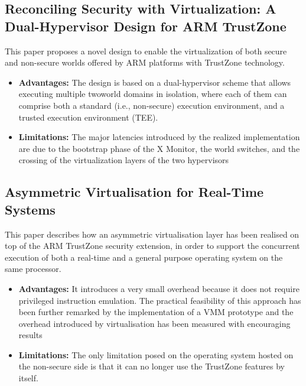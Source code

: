 \documentclass[conference]{IEEEtran}
\begin{document}
\subsection{Reconciling Security with Virtualization: A Dual-Hypervisor Design for ARM TrustZone}
This paper proposes a novel design to enable the virtualization of both secure and non-secure worlds offered by ARM platforms with TrustZone technology.
\begin{itemize}
    \item \textbf{Advantages:} The design is based on a dual-hypervisor scheme that allows executing multiple twoworld domains in isolation, where each of them can comprise both a standard (i.e., non-secure) execution environment, and a trusted execution environment (TEE).
    \item \textbf{Limitations:} The major latencies introduced by the realized implementation are due to the bootstrap phase of the X Monitor, the world switches, and the crossing of the virtualization layers of the two hypervisors
\end{itemize}


\subsection{Asymmetric Virtualisation for Real-Time Systems}
This paper describes how an asymmetric virtualisation layer has been realised on top of the ARM TrustZone security extension, in order to support the concurrent execution of both a real-time and a general purpose operating system on the same processor.
\begin{itemize}
    \item \textbf{Advantages:} It introduces a very small overhead because it does not require privileged instruction emulation. The practical feasibility of this approach has been further remarked by the implementation of a VMM prototype and the overhead introduced by virtualisation has been measured with encouraging results
    \item \textbf{Limitations:} The only limitation posed on the operating system hosted on the non-secure side is that it can no longer use the TrustZone features by itself.
\end{itemize}
\end{document}
